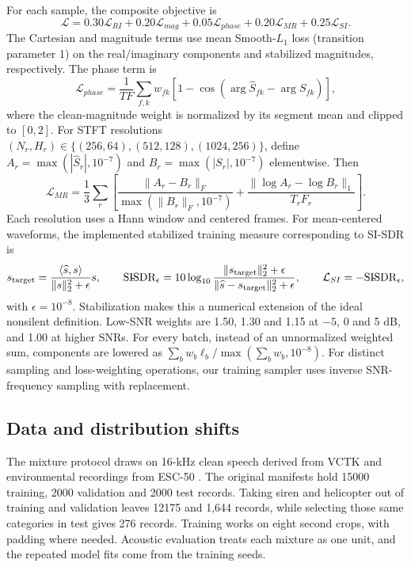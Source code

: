\documentclass[10pt,a4paper]{article}
\newcommand{\norm}[1]{\lVert #1\rVert}
\newcommand{\sisdr}{\mathrm{SI\!\text{-}\!SDR}}
\begin{document}
For each sample, the composite objective is
\begin{equation}
\mathcal L=0.30\mathcal L_{RI}+0.20\mathcal L_{mag}+0.05\mathcal L_{phase}
+0.20\mathcal L_{MR}+0.25\mathcal L_{SI}.
\end{equation}
The Cartesian and magnitude terms use mean Smooth-$L_1$ loss (transition parameter 1) on the real/imaginary components and stabilized magnitudes, respectively. The phase term is
\begin{equation}
\mathcal L_{phase}=\frac1{TF}\sum_{f,k}w_{fk}\left[1-\cos(\arg\widehat S_{fk}-\arg S_{fk})\right],
\end{equation}
where the clean-magnitude weight is normalized by its segment mean and clipped to $[0,2]$. For STFT resolutions $(N_r,H_r)\in\{(256,64),(512,128),(1024,256)\}$, define $A_r=\max(|\widehat S_r|,10^{-7})$ and $B_r=\max(|S_r|,10^{-7})$ elementwise. Then
\begin{equation}
\mathcal L_{MR}=\frac13\sum_r\left[
\frac{\norm{A_r-B_r}_F}{\max(\norm{B_r}_F,10^{-7})}
+\frac{\norm{\log A_r-\log B_r}_1}{T_rF_r}\right].
\end{equation}
Each resolution uses a Hann window and centered frames. For mean-centered waveforms, the implemented stabilized training measure corresponding to SI-SDR \cite{sisdr} is
\begin{equation}
s_{\rm target}=\frac{\langle\widehat s,s\rangle}{\norm{s}_2^2+\epsilon}s,\qquad
\sisdr_\epsilon=10\log_{10}\frac{\norm{s_{\rm target}}_2^2+\epsilon}{\norm{\widehat s-s_{\rm target}}_2^2+\epsilon},\qquad
\mathcal L_{SI}=-\sisdr_\epsilon,
\end{equation}
with $\epsilon=10^{-8}$. Stabilization makes this a numerical extension of the ideal nonsilent definition. Low-SNR weights are 1.50, 1.30 and 1.15 at $-5$, 0 and 5 dB, and 1.00 at higher SNRs. For every batch, instead of an unnormalized weighted sum, components are lowered as $\sum_b w_b\ell_b/\max(\sum_b w_b,10^{-8})$. For distinct sampling and loss-weighting operations, our training sampler uses inverse SNR-frequency sampling with replacement.

\subsection{Data and distribution shifts}
The mixture protocol draws on 16-kHz clean speech derived from VCTK and environmental recordings from ESC-50 \cite{vctk,esc50}. The original manifests hold 15000 training, 2000 validation and 2000 test records. Taking siren and helicopter out of training and validation leaves 12175 and 1,644 records, while selecting those same categories in test gives 276 records. Training works on eight second crops, with padding where needed. Acoustic evaluation treats each mixture as one unit, and the repeated model fits come from the training seeds.
\end{document}

